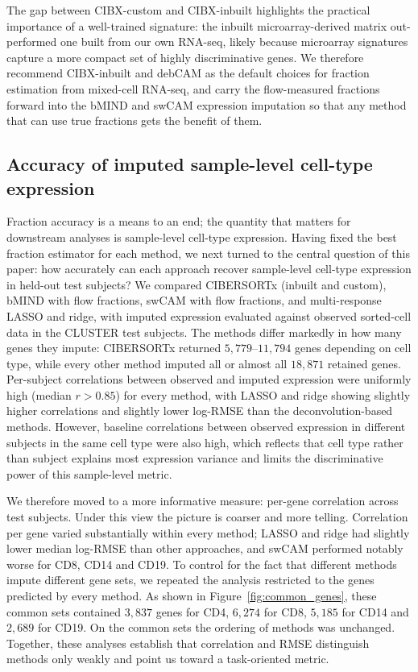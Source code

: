 \documentclass[11pt]{article}
\begin{document}
The gap between CIBX-custom and CIBX-inbuilt highlights the practical
importance of a well-trained signature: the inbuilt microarray-derived
matrix out-performed one built from our own RNA-seq, likely because
microarray signatures capture a more compact set of highly
discriminative genes. We therefore recommend CIBX-inbuilt and debCAM
as the default choices for fraction estimation from mixed-cell
RNA-seq, and carry the flow-measured fractions forward into the bMIND
and swCAM expression imputation so that any method that can use true
fractions gets the benefit of them.

\subsection{Accuracy of imputed sample-level cell-type expression}

Fraction accuracy is a means to an end; the quantity that matters for
downstream analyses is sample-level cell-type expression. Having
fixed the best fraction estimator for each method, we next turned to
the central question of this paper: how accurately can each approach
recover sample-level cell-type expression in held-out test subjects?
We compared CIBERSORTx (inbuilt and custom), bMIND with flow
fractions, swCAM with flow fractions, and multi-response LASSO and
ridge, with imputed expression evaluated against observed sorted-cell
data in the CLUSTER test subjects. The
methods differ markedly in how many genes they impute:
CIBERSORTx returned $5{,}779$--$11{,}794$ genes depending on cell
type, while every other method imputed all or almost all $18{,}871$
retained genes. Per-subject correlations between observed and imputed
expression were uniformly high (median $r > 0.85$) for every method,
with LASSO and ridge showing slightly higher correlations and slightly
lower log-RMSE than the deconvolution-based methods. However, baseline
correlations between observed expression in different subjects in the
same cell type were also high, which reflects that cell type rather
than subject explains most expression variance and limits the
discriminative power of this sample-level metric.

We therefore moved to a more informative measure: per-gene
correlation across test subjects. Under this view the picture is
coarser and more telling. Correlation per gene varied substantially
within every method; LASSO and ridge had slightly lower median log-RMSE
than other approaches, and swCAM performed notably worse for CD8, CD14
and CD19. To control for the fact that different methods impute
different gene sets, we repeated the analysis restricted to the
genes predicted by every method. As shown in
Figure~\ref{fig:common_genes}, these common sets contained
$3{,}837$ genes for CD4, $6{,}274$ for CD8, $5{,}185$ for CD14 and
$2{,}689$ for CD19. On the common sets the ordering of methods was
unchanged. Together, these analyses establish that correlation and
RMSE distinguish methods only weakly and point us toward a
task-oriented metric.
\end{document}
